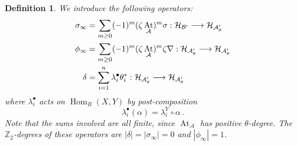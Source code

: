 \documentclass[english,letter paper,12pt,leqno]{article}
\theoremstyle{example}
\newtheorem{definition}[theorem]{Definition}
\numberwithin{equation}{section}
\def\AA{\mathcal{A}}
\def\BB{\mathcal{B}}
\def\HH{\HH}
\def\HH{\mathcal{H}}
\def\Hom{\operatorname{Hom}}
\def\nZ{\mathds{Z}}
\DeclareMathOperator{\vAt}{At}
\begin{document}
\begin{definition}\label{defn:important_operators} We introduce the following operators:
\begin{align*}
\sigma_\infty &= \sum_{m \ge 0} (-1)^m (\zeta \vAt_{\AA})^m \sigma: \HH_{\BB'} \lto \HH_{\AA'_\theta}\\
\phi_\infty &= \sum_{m \ge 0} (-1)^m (\zeta \vAt_{\AA})^m \zeta \nabla: \HH_{\AA'_\theta} \lto \HH_{\AA'_\theta}\\
\delta &= \sum_{i=1}^n \lambda^\bullet_i \theta_i^*: \HH_{\AA'_\theta} \lto \HH_{\AA'_\theta}
\end{align*}
where $\lambda_i^\bullet$ acts on $\Hom_R(X,Y)$ by post-composition
\[
\lambda_i^\bullet(\alpha) = \lambda_i^Y \circ \alpha\,.
\]
Note that the sums involved are all finite, since $\vAt_{\AA}$ has positive $\theta$-degree. The $\nZ_2$-degrees of these operators are $|\delta| = |\sigma_\infty| = 0$ and $|\phi_\infty| = 1$.
\end{definition}
\end{document}
